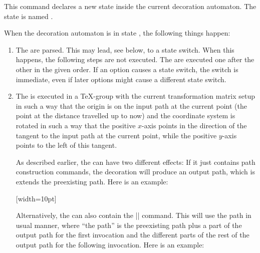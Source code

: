 \begin{command}{\pgfdeclaredecoration{}}
  \begin{command}{\state{}}
    This command declares a new state inside the current decoration
    automaton. The state is named .
    
    When the decoration automaton is in state , the following things
    happen:
    \begin{enumerate}
    \item
      The  are parsed. This may lead, see below, to a 
      state switch. When this happens, the following steps are not
      executed. The  are executed one after the other in
      the given order. If an option causes a state switch, the switch
      is immediate, even if later options might cause a different
      state switch.
    \item
      The  is executed in a \TeX-group with the current
      transformation matrix setup in such a way that the origin is on
      the input path at the current point (the point at the distance
      travelled up to now) and the coordinate system is rotated in
      such a way that the positive $x$-axis points in the direction of
      the tangent to the input path at the current point, while the
      positive $y$-axis points to the left of this tangent.
      
      As described earlier, the  can have two different
      effects: If it just contains path construction commands, the
      decoration will produce an output path, which is extends the
      preexisting path. Here is an example:

\begin{codeexample}[]
{
  [width=10pt]
  {
    \pgfpathlineto{\pgfpoint{0pt}{5pt}}
    \pgfpathlineto{\pgfpoint{5pt}{5pt}}
    \pgfpathlineto{\pgfpoint{5pt}{-5pt}}
    \pgfpathlineto{\pgfpoint{10pt}{-5pt}}
    \pgfpathlineto{\pgfpoint{10pt}{0pt}}
  }
  {
    \pgfpathlineto{\pgfpointdecoratedpathlast}
  }
}
\end{codeexample}

    Alternatively, the  can also contain the
    |\pgfusepath| command. This will use the path in usual manner,
    where ``the path'' is the preexisting path plus a part of the
    output path for the first invocation and the different parts of
    the rest of the output path for the following invocation. Here is
    an example:
            

\end{enumerate}
\end{command}
\end{command}
